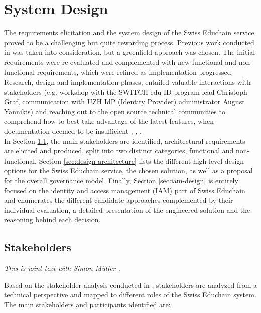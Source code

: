 \chapter{System Design} \label{ch:design}

The requirements elicitation and the system design of the Swiss Educhain service proved to be a challenging but quite rewarding process. Previous work conducted in \cite{Gres18} was taken into consideration, but a greenfield approach was chosen. The initial requirements were re-evaluated and complemented with new functional and non-functional requirements, which were refined as implementation progressed. Research, design and implementation phases, entailed valuable interactions with stakeholders (e.g. workshop with the SWITCH edu-ID  program lead Christoph Graf, communication with UZH IdP (Identity Provider) administrator August Yannikis) and reaching out to the open source technical communities to comprehend how to best take advantage of the latest features, when documentation deemed to be insufficient \cite{shib-user-group-question}, \cite{stackoverflow-corda-service}, \cite{stackoverflow-corda-accounts}. \\
In Section \ref{sec:stakeholders}, the main stakeholders are identified, architectural requirements are elicited and produced, split into two distinct categories, functional and non-functional. Section \ref{sec:design-architecture} lists the different high-level design options for the Swiss Educhain service, the chosen solution, as well as a proposal for the overall governance model. Finally, Section \ref{sec:iam-design} is entirely focused on the identity and access management (IAM) part of Swiss Educhain and enumerates the different candidate approaches complemented by their individual evaluation, a detailed presentation of the engineered solution and the reasoning behind each decision.

\section{Stakeholders} \label{sec:stakeholders}

\emph{This is joint text with Simon M{\"u}ller \cite{mueller20}.}

Based on the stakeholder analysis conducted in \cite{Gres18}, stakeholders are analyzed from a technical perspective and mapped to different roles of the Swiss Educhain system. The main stakeholders and participants identified are:

